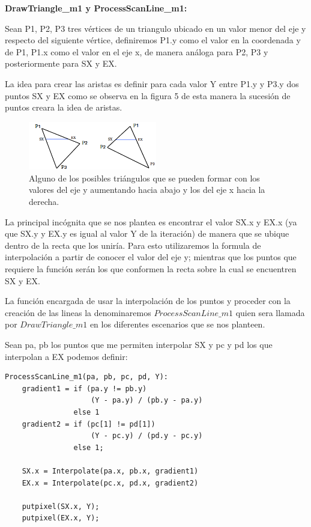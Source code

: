 \documentclass[a4paper]{article}
\begin{document}
\textbf{DrawTriangle\_m1 y ProcessScanLine\_m1:}
\par Sean  P1, P2, P3 tres vértices de un triangulo ubicado en un valor menor del eje y respecto del siguiente vértice, definiremos P1.y como el valor en la coordenada y de P1, P1.x como el valor en el eje x, de manera análoga para P2, P3 y posteriormente para SX y EX. 
\par La idea para crear las aristas es definir para cada valor Y entre P1.y y P3.y dos puntos SX y EX como se observa en la figura 5 de esta manera la sucesión de puntos creara la idea de aristas.
\begin{figure}[h]
    \centering
    \includegraphics[width=0.50\textwidth]{Imagenes/e.png}
    \caption{Alguno de los posibles triángulos que se pueden formar con los valores del eje y aumentando hacia abajo y los del eje x hacia la derecha.}
    \label{trian}
\end{figure}
\par La principal incógnita que se nos plantea es encontrar el valor SX.x y EX.x (ya que SX.y y EX.y es igual al valor Y de la iteración) de manera que se ubique dentro de la recta que los uniría. Para esto utilizaremos la formula de interpolación a partir de conocer el valor del eje y; mientras que los puntos que requiere la función serán los que conformen la recta sobre la cual se encuentren SX y EX.
\par La función encargada de usar la interpolación de los puntos y proceder con la creación de las lineas la denominaremos $ProcessScanLine\_m1$ quien sera llamada por $DrawTriangle\_m1$ en los diferentes escenarios que se nos planteen. 
\par Sean pa, pb los puntos que me permiten interpolar SX y pc y pd los que interpolan a EX podemos definir: 
\begin{verbatim}
ProcessScanLine_m1(pa, pb, pc, pd, Y):
    gradient1 = if (pa.y != pb.y) 
                    (Y - pa.y) / (pb.y - pa.y)
                else 1                          
    gradient2 = if (pc[1] != pd[1]) 
                    (Y - pc.y) / (pd.y - pc.y)
                else 1;
            
    SX.x = Interpolate(pa.x, pb.x, gradient1)
    EX.x = Interpolate(pc.x, pd.x, gradient2)
    
    putpixel(SX.x, Y);
    putpixel(EX.x, Y);
\end{verbatim}
\end{document}
